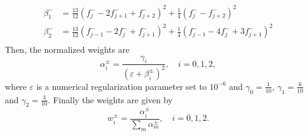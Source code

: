 \begin{subappendices}
$$\begin{aligned}
    \beta_1^- &= \frac{13}{12}(f^-_{j}   - 2f^-_{j+1} + f^-_{j+2})^2 + \frac{1}{4}( f^-_{j}   -  f^-_{j+2})^2 \\
    \beta_2^- &= \frac{13}{12}(f^-_{j-1} - 2f^-_{j}   + f^-_{j+1})^2 + \frac{1}{4}( f^-_{j-1} - 4f^-_{j}   + 3f^-_{j+1})^2 \\
  \end{aligned}
$$
Then, the normalized weights are
$$
  \alpha_i^\pm = \frac{\gamma_i}{(\varepsilon + \beta_i^\pm)^2},\quad i=0,1,2,
$$
where  $\varepsilon$ is a numerical regularization parameter set to $10^{-6}$
and $\gamma_0=\frac{1}{10}$, $\gamma_1=\frac{6}{10}$
and $\gamma_2=\frac{3}{10}$. Finally the weights are given by
$$
  w_i^\pm = \frac{\alpha_i^\pm}{\sum_m \alpha_m^\pm},\quad i=0,1,2.
$$
\end{subappendices}

